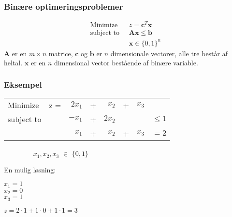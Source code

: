 \documentclass{beamer}
\begin{document}
\begin{frame}
\frametitle{Binære optimeringsproblemer}
\begin{align}
 \text{Minimize }\; &z =  \mathbf{c}^T\mathbf{x} \\ 
 \text{subject to } \; & \mathbf{A}\mathbf{x} \leq \mathbf{b} \\ 
 & \mathbf{x} \in \{0,1\}^n
\end{align} \noindent
$\mathbf{A}$ er en $m \times n$ matrice, $\mathbf{c}$ og $\mathbf{b}$ er $n$ dimensionale vectorer, alle tre består af 
heltal. $\mathbf{x}$ er en $n$ dimensional vector bestående af binære variable.   
\end{frame}


\begin{frame}
\frametitle{Eksempel}
\begin{table}[]
\begin{center}
\label{my-label}
\begin{tabular}{llrcrlrl}
Minimize   & z = & $2x_1$        & +  & $x_2$       & + & $x_3$ &          \\
subject to &     & $-x_1$        & + & $2x_2$      &   &       & $\leq 1$  \\
           &     & $x_1$         & + & $x_2$       & + & $x_3$ & $=2$     
               
\end{tabular}
\end{center}
$\qquad \qquad $  $x_1,x_2,x_3 $  $\in$ $\{0,1\}$ 
\end{table}
En mulig løsning: \\
\vspace{0.2cm}
\begin{minipage}{0.47\linewidth}
 $x_1 = 1$  \\
 $x_2 = 0$ \\ 
 $x_3 = 1$ \\
\end{minipage}
\begin{minipage}{0.47\linewidth}

 $z = 2\cdot 1 + 1\cdot 0 + 1\cdot 1  =3$ \\
\end{minipage}

\end{frame}
\end{document}

